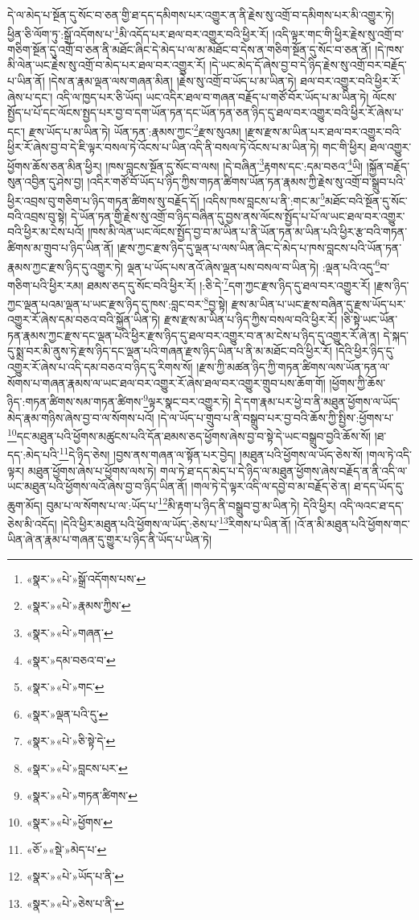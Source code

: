 དེ་ལ་མེད་པ་སྔོན་དུ་སོང་བ་ཅན་གྱི་ཐ་དད་དམིགས་པར་འགྱུར་ན་ནི་རྗེས་སུ་འགྲོ་བ་དམིགས་པར་མི་འགྱུར་ཏེ། ཕྱིན་ཅི་ལོག་ཏུ་:སྒྲོ་འདོགས་པ་\footnote{«སྣར་»«པེ་»སྒྲོ་འདོགས་པས་}མི་འདོད་པར་ཐལ་བར་འགྱུར་བའི་ཕྱིར་རོ། །འདི་ལྟར་གང་གི་ཕྱིར་རྗེས་སུ་འགྲོ་བ་གཅིག་སྔོན་དུ་འགྲོ་བ་ཅན་ནི་མཐོང་ཞིང་དེ་མེད་པ་ལ་མ་མཐོང་བ་དེས་ན་གཅིག་སྔོན་དུ་སོང་བ་ཅན་ནོ། །དེ་ཁས་མི་ལེན་ཡང་རྗེས་སུ་འགྲོ་བ་མེད་པར་ཐལ་བར་འགྱུར་རོ། །དེ་ཡང་མེད་དོ་ཞེས་བྱ་བ་དེ་ཉིད་རྗེས་སུ་འགྲོ་བར་བརྗོད་པ་ཡིན་ནོ། །དེས་ན་རྣམ་ལྡན་ལས་གཞན་མིན། །རྗེས་སུ་འགྲོ་བ་ཡོད་པ་མ་ཡིན་ཏེ། ཐལ་བར་འགྱུར་བའི་ཕྱིར་རོ་ཞེས་པ་དང་། འདི་ལ་ཁྱད་པར་ཅི་ཡོད། ཡང་འདིར་ཐལ་བ་གཞན་བརྗོད་པ་གཙོ་བོར་ཡོད་པ་མ་ཡིན་ཏེ། ལོངས་སྤྱོད་པ་པོ་དང་ལོངས་སྤྱད་པར་བྱ་བ་དག་ཡོན་ཏན་དང་ཡོན་ཏན་ཅན་ཉིད་དུ་ཐལ་བར་འགྱུར་བའི་ཕྱིར་རོ་ཞེས་པ་དང་། རྫས་ཡོད་པ་མ་ཡིན་ཏེ། ཡོན་ཏན་:རྣམས་ཀྱང་\footnote{«སྣར་»«པེ་»རྣམས་ཀྱིས་}རྫས་སུའམ། །རྫས་རྫས་མ་ཡིན་པར་ཐལ་བར་འགྱུར་བའི་ཕྱིར་རོ་ཞེས་བྱ་བ་དེ་ཇི་ལྟར་བསལ་ཏེ་འོངས་པ་ཡིན་འདི་ནི་བསལ་ཏེ་འོངས་པ་མ་ཡིན་ཏེ། གང་གི་ཕྱིར། ཐལ་འགྱུར་ཕྱོགས་ཆོས་ཅན་མིན་ཕྱིར། །ཁས་བླངས་སྔོན་དུ་སོང་བ་ལས། །དེ་བཞིན་\footnote{«སྣར་»«པེ་»གཞན་}རྟགས་དང་:དམ་བཅའ་\footnote{«སྣར་»དམ་བཅའ་བ་}ཡི། །སྐྱོན་བརྗོད་སུན་འབྱིན་དུ་ཤེས་བྱ། །འདིར་གཙོ་བོ་ཡོད་པ་ཉིད་ཀྱིས་གཏན་ཚིགས་ཡོན་ཏན་རྣམས་ཀྱི་རྗེས་སུ་འགྲོ་བ་སྒྲུབ་པའི་ཕྱིར་འབྲས་བུ་གཅིག་པ་ཉིད་གཏན་ཚིགས་སུ་བརྗོད་དོ། །འདིས་ཁས་བླངས་པ་ནི་:གང་མ་\footnote{«སྣར་»«པེ་»གང་}མཐོང་བའི་སྔོན་དུ་སོང་བའི་འབྲས་བུ་སྟེ། དེ་ཡོན་ཏན་གྱི་རྗེས་སུ་འགྲོ་བ་ཉིད་བཞིན་དུ་བྱས་ནས་ལོངས་སྤྱོད་པ་པོ་ལ་ཡང་ཐལ་བར་འགྱུར་བའི་ཕྱིར་མ་ངེས་པའོ། །ཁས་མི་ལེན་ཡང་ལོངས་སྤྱོད་བྱ་བ་མ་ཡིན་པ་ནི་ཡོན་ཏན་མ་ཡིན་པའི་ཕྱིར་རྩ་བའི་གཏན་ཚིགས་མ་གྲུབ་པ་ཉིད་ཡིན་ནོ། །རྫས་ཀྱང་རྫས་ཉིད་དུ་ལྡན་པ་ལས་ཡིན་ཞིང་དེ་མེད་པ་ཁས་བླངས་པའི་ཡོན་ཏན་རྣམས་ཀྱང་རྫས་ཉིད་དུ་འགྱུར་ཏེ། ལྡན་པ་ཡོད་པས་ནའོ་ཞེས་ལྡན་པས་བསལ་བ་ཡིན་ཏེ། :ལྡན་པའི་འདུ་\footnote{«སྣར་»ལྡན་པའི་དུ་}བ་གཅིག་པའི་ཕྱིར་རམ། ཐམས་ཅད་དུ་སོང་བའི་ཕྱིར་རོ། །:ཅི་དེ་\footnote{«སྣར་»«པེ་»ཅི་སྟེ་དེ་}དག་ཀྱང་རྫས་ཉིད་དུ་ཐལ་བར་འགྱུར་རོ། །རྫས་ཉིད་ཀྱང་ལྡན་པའམ་ལྡན་པ་ཡང་རྫས་ཉིད་དུ་ཁས་:བླང་བར་\footnote{«སྣར་»«པེ་»བླངས་པར་}བྱ་སྟེ། རྫས་མ་ཡིན་པ་ཡང་རྫས་བཞིན་དུ་རྫས་ཡོད་པར་འགྱུར་རོ་ཞེས་དམ་བཅའ་བའི་སྐྱོན་ཡིན་ཏེ། རྫས་རྫས་མ་ཡིན་པ་ཉིད་ཀྱིས་བསལ་བའི་ཕྱིར་རོ། །ཅི་སྟེ་ཡང་ཡོན་ཏན་རྣམས་ཀྱང་རྫས་དང་ལྡན་པའི་ཕྱིར་རྫས་ཉིད་དུ་ཐལ་བར་འགྱུར་བ་ན་མ་ངེས་པ་ཉིད་དུ་འགྱུར་རོ་ཞེ་ན། དེ་སྐད་དུ་སྨྲ་བར་མི་ནུས་ཏེ་རྫས་ཉིད་དང་ལྡན་པའི་གཞན་རྫས་ཉིད་ཡིན་པ་ནི་མ་མཐོང་བའི་ཕྱིར་རོ། །དེའི་ཕྱིར་ཉིད་དུ་འགྱུར་རོ་ཞེས་པ་འདི་དམ་བཅའ་བ་ཉིད་དུ་རིགས་སོ། །རྫས་ཀྱི་མཚན་ཉིད་ཀྱི་གཏན་ཚིགས་ལས་ཡོན་ཏན་ལ་སོགས་པ་གཞན་རྣམས་ལ་ཡང་ཐལ་བར་འགྱུར་རོ་ཞེས་ཐལ་བར་འགྱུར་གྲུབ་པས་ཆོག་གོ། །ཕྱོགས་ཀྱི་ཆོས་ཉིད་:གཏན་ཚིགས་སམ་གཏན་ཚིགས་\footnote{«སྣར་»«པེ་»གཏན་ཚིགས་}ལྟར་སྣང་བར་འགྱུར་ཏེ། དེ་དག་རྣམ་པར་ཕྱེ་བ་ནི་མཐུན་ཕྱོགས་ལ་ཡོད་མེད་རྣམ་གཉིས་ཞེས་བྱ་བ་ལ་སོགས་པའོ། །དེ་ལ་ཡོད་པ་གྲུབ་པ་ནི་བསྒྲུབ་པར་བྱ་བའི་ཆོས་ཀྱི་སྤྱིས་:ཕྱོགས་པ་\footnote{«སྣར་»«པེ་»ཕྱོགས་}དང་མཐུན་པའི་ཕྱོགས་མཚུངས་པའི་དོན་ཐམས་ཅད་ཕྱོགས་ཞེས་བྱ་བ་སྟེ་དེ་ཡང་བསྒྲུབ་བྱའི་ཆོས་སོ། །ཐ་དད་:མེད་པའི་\footnote{«ཅོ་»«སྡེ་»མེད་པ་}དེ་ཉིད་ཅེས། །བྱས་ནས་གཞན་ལ་སྟོན་པར་བྱེད། །མཐུན་པའི་ཕྱོགས་ལ་ཡོད་ཅེས་སོ། །གལ་ཏེ་འདི་ལྟར། མཐུན་ཕྱོགས་ཞེས་པ་ཕྱོགས་ལས་ཏེ། གལ་ཏེ་ཐ་དད་མེད་པ་དེ་ཉིད་ལ་མཐུན་ཕྱོགས་ཞེས་བརྗོད་ན་ནི་འདི་ལ་ཡང་མཐུན་པའི་ཕྱོགས་ལའོ་ཞེས་བྱ་བ་ཉིད་ཡིན་ནོ། །གལ་ཏེ་དེ་ལྟར་འདི་ལ་དབྱེ་བ་མ་བརྗོད་ཅེ་ན། ཐ་དད་ཡོད་དུ་ཆུག་མོད། བུམ་པ་ལ་སོགས་པ་ལ་:ཡོད་པ་\footnote{«སྣར་»«པེ་»ཡོད་པ་ནི་}མི་རྟག་པ་ཉིད་ནི་བསྒྲུབ་བྱ་མ་ཡིན་ཏེ། དེའི་ཕྱིར། འདི་ལའང་ཐ་དད་ཅེས་མི་འདོད། །དེའི་ཕྱིར་མཐུན་པའི་ཕྱོགས་ལ་ཡོད་:ཅེས་པ་\footnote{«སྣར་»«པེ་»ཅེས་པ་ནི་}རིགས་པ་ཡིན་ནོ། །འོ་ན་མི་མཐུན་པའི་ཕྱོགས་གང་ཡིན་ཞེ་ན་རྣམ་པ་གཞན་དུ་གྱུར་པ་ཉིད་ནི་ཡོད་པ་ཡིན་ཏེ། 